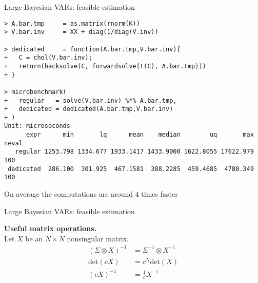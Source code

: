 \documentclass[notes,blackandwhite,mathsans,usenames,dvipsnames]{beamer}
\begin{document}
\begin{frame}[fragile]{Large Bayesian VARs: feasible estimation}

\scriptsize
\begin{verbatim}
> A.bar.tmp     = as.matrix(rnorm(K))
> V.bar.inv     = XX + diag(1/diag(V.inv))

> dedicated     = function(A.bar.tmp,V.bar.inv){
+   C = chol(V.bar.inv); 
+   return(backsolve(C, forwardsolve(t(C), A.bar.tmp)))
+ }

> microbenchmark(
+   regular   = solve(V.bar.inv) %*% A.bar.tmp,
+   dedicated = dedicated(A.bar.tmp,V.bar.inv)
+ )
Unit: microseconds
      expr      min       lq      mean    median        uq       max neval
   regular 1253.798 1334.677 1933.1417 1433.9000 1622.8055 17622.979   100
 dedicated  286.100  301.925  467.1581  388.2285  459.4685  4780.349   100
\end{verbatim}

\normalsize\bigskip
{\color{mcxs2}On average the computations are around 4 times faster}

\end{frame}






\begin{frame}{Large Bayesian VARs: feasible estimation}

\textbf{Useful matrix operations.}\\
{\color{mcxs2}Let} $X$ {\color{mcxs2}be an} $N\times N$ {\color{mcxs2}nonsingular matrix.}
\begin{align*}
\left(\Sigma\otimes X\right)^{-1}&= \Sigma^{-1}\otimes X^{-1}\\
\text{det}(cX)&= c^N\text{det}(X)\\
(cX)^{-1}&= \frac{1}{c}X^{-1}
\end{align*}
\end{frame}








%
%
%
%
\end{document}
